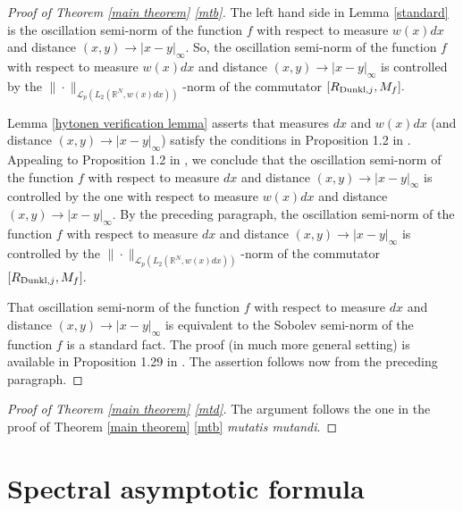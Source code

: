 \documentclass{amsart}
\begin{document}
\begin{proof}[Proof of Theorem \ref{main theorem} \eqref{mtb}] The left hand side in Lemma \ref{standard} is the oscillation semi-norm of the function $f$ with respect to measure $w(x)dx$ and distance $(x,y)\to |x-y|_{\infty}.$ So, the oscillation semi-norm of the function $f$ with respect to measure $w(x)dx$ and distance $(x,y)\to |x-y|_{\infty}$ is controlled by the $\|\cdot\|_{\mathcal{L}_p(L_2(\mathbb{R}^N,w(x)dx))}$-norm of the commutator $[R_{{\rm Dunkl},j},M_f].$

Lemma \ref{hytonen verification lemma} asserts that measures $dx$ and $w(x)dx$ (and distance $(x,y)\to |x-y|_{\infty}$) satisfy the conditions in Proposition 1.2 in \cite{Hytonen-new}. Appealing to Proposition 1.2 in \cite{Hytonen-new}, we conclude that the oscillation semi-norm of the function $f$ with respect to measure $dx$ and distance $(x,y)\to |x-y|_{\infty}$ is controlled by the one with respect to measure $w(x)dx$ and distance $(x,y)\to |x-y|_{\infty}.$ By the preceding paragraph, the oscillation semi-norm of the function $f$ with respect to measure $dx$ and distance $(x,y)\to |x-y|_{\infty}$ is controlled by the $\|\cdot\|_{\mathcal{L}_p(L_2(\mathbb{R}^N,w(x)dx))}$-norm of the commutator $[R_{{\rm Dunkl},j},M_f].$

That oscillation semi-norm of the function $f$ with respect to measure $dx$ and distance $(x,y)\to |x-y|_{\infty}$ is equivalent to the Sobolev semi-norm of the function $f$ is a standard fact. The proof (in much more general setting) is available in Proposition 1.29 in \cite{HKarxiv}. The assertion follows now from the preceding paragraph. 
\end{proof}

\begin{proof}[Proof of Theorem \ref{main theorem} \eqref{mtd}] The argument follows the one in the proof of Theorem \ref{main theorem} \eqref{mtb} {\it mutatis mutandi}.
\end{proof}


\section{Spectral asymptotic formula}
\setcounter{equation}{0}
\end{document}
